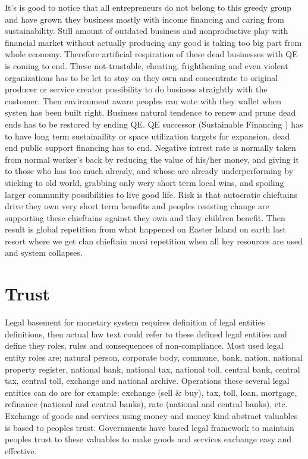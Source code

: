 It's is good to notice that all entrepreneurs do not belong to this greedy group and have grown they business mostly with income financing and caring from sustainability. Still amount of outdated business and nonproductive play with financial market without actually producing any good is taking too big part from whole economy. Therefore artificial respiration of these dead businesses with QE is coming to end. These not-trustable, cheating, frighthening and even violent organizations has to be let to stay on they own and concentrate to original producer or service creator possibility to do business straightly with the customer. Then environment aware peoples can wote with they wallet when systen has been built right. Business natural tendence to renew and prune dead ends has to be restored by ending QE. QE successor (Sustainable Financing \cite{EU_Sustainable_finance}) has to have long term sustainaility or space utilization targets for expansion, dead end public support financing has to end. Negative intrest rate is normally taken from normal worker's back by reducing the value of his/her money, and giving it to those who has too much already, and whose are already underperforming by sticking to old world, grabbing only wery short term local wins, and spoiling larger community possibilities to live good life. Risk is that autocratic chieftains drive they own very short term benefits and peoples resisting change are supporting these chieftains against they own and they children benefit. Then result is global repetition from what happened on Easter Island on earth last resort where we get clan chieftain moai repetition when all key resources are used and system collapses.

\section{Trust}
\label{trust}
Legal basement for monetary system requires definition of legal entities definitions, then actual law text could refer to these defined legal entities and define they roles, rules and consequences of non-compliance. Most used legal entity roles are; natural person, corporate body, commune, bank, nation, national property register, national bank, national tax, national toll, central bank, central tax, central toll, exchange and national archive. Operations these several legal entities can do are for example: exchange (sell \& buy), tax, toll, loan, mortgage, refinance (national and central banks), rate (national and central banks), etc. Exchange of goods and services using money and money kind abstract valuables is based to peoples trust. Governments have based legal framework to maintain peoples trust to these valuables to make goods and services exchange easy and effective.

